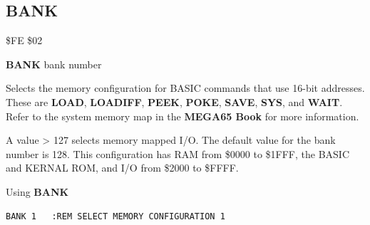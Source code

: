 
\newpage
\subsection{BANK}
\begin{description}[leftmargin=2cm,style=nextline]
\item [Token:] \$FE \$02
\item [Format:] {\bf BANK} bank number
\item [Usage:] Selects the memory configuration
               for BASIC commands that use 16-bit addresses.
               These are {\bf LOAD}, {\bf LOADIFF}, {\bf PEEK}, {\bf POKE}, {\bf SAVE}, {\bf SYS}, and {\bf WAIT}.
               Refer to the system memory map in
\ifdefined\printmanual
the {\bf MEGA65 Book}
\else
\fi
for more information.
\item [Remarks:] A value > 127 selects memory mapped I/O.
                 The default value for the bank number is 128.
                 This configuration has RAM from \$0000 to \$1FFF,
                 the BASIC and KERNAL ROM, and I/O from \$2000 to \$FFFF.
\item [Example:] Using {\bf BANK}
\begin{tcolorbox}[colback=black,coltext=white]
\verbatimfont{\codefont}
\begin{verbatim}
BANK 1   :REM SELECT MEMORY CONFIGURATION 1
\end{verbatim}
\end{tcolorbox}
\end{description}


\newpage
